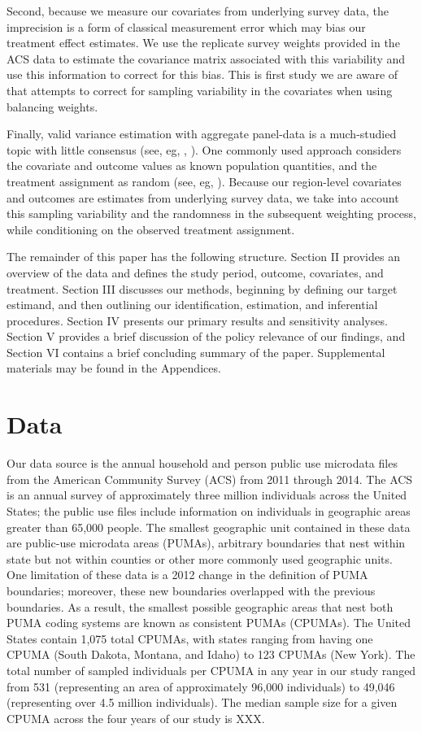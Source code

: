 \documentclass[12pt]{article}
\begin{document}
Second, because we measure our covariates from underlying survey data, the imprecision is a form of classical measurement error which may bias our treatment effect estimates. We use the replicate survey weights provided in the ACS data to estimate the covariance matrix associated with this variability and use this information to correct for this bias. This is first study we are aware of that attempts to correct for sampling variability in the covariates when using balancing weights.

Finally, valid variance estimation with aggregate panel-data is a much-studied topic with little consensus (see, eg, \cite{hahn2017synthetic}, \cite{chernozhukov2017exact}). One commonly used approach considers the covariate and outcome values as known population quantities, and the treatment assignment as random (see, eg, \cite{abadie2010synthetic}). Because our region-level covariates and outcomes are estimates from underlying survey data, we take into account this sampling variability and the randomness in the subsequent weighting process, while conditioning on the observed treatment assignment.

The remainder of this paper has the following structure. Section II provides an overview of the data and defines the study period, outcome, covariates, and treatment. Section III discusses our methods, beginning by defining our target estimand, and then outlining our identification, estimation, and inferential procedures. Section IV presents our primary results and sensitivity analyses. Section V provides a brief discussion of the policy relevance of our findings, and Section VI contains a brief concluding summary of the paper. Supplemental materials may be found in the Appendices.

\section{Data}

Our data source is the annual household and person public use microdata files from the American Community Survey (ACS) from 2011 through 2014. The ACS is an annual survey of approximately three million individuals across the United States; the public use files include information on individuals in geographic areas greater than 65,000 people. The smallest geographic unit contained in these data are public-use microdata areas (PUMAs), arbitrary boundaries that nest within state but not within counties or other more commonly used geographic units. One limitation of these data is a 2012 change in the definition of PUMA boundaries; moreover, these new boundaries overlapped with the previous boundaries. As a result, the smallest possible geographic areas that nest both PUMA coding systems are known as consistent PUMAs (CPUMAs). The United States contain 1,075 total CPUMAs, with states ranging from having one CPUMA (South Dakota, Montana, and Idaho) to 123 CPUMAs (New York). The total number of sampled individuals per CPUMA in any year in our study ranged from 531 (representing an area of approximately 96,000 individuals) to 49,046 (representing over 4.5 million individuals). The median sample size for a given CPUMA across the four years of our study is XXX.
\end{document}
